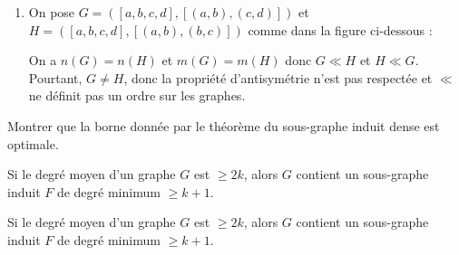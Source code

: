 \begin{td-sol}
\begin{enumerate}
\begin{enumerate}[label=(\alph*)]
            \item \textbf{Transitivité :} soient \(G, H\) et \(I\) trois graphes tels que \(G\) est sous-graphe de \(H\) et \(H\) est sous-graphe de \(I\).
            \begin{equation*}
                \begin{aligned}
                    V(G) \subseteq V(H) \quad\text{et}\quad V(H) \subseteq V(I) &\implies V(G) \subseteq V(I) \\
                    E(G) \subseteq E(H) \quad\text{et}\quad E(H) \subseteq E(I) &\implies E(G) \subseteq E(I)
                \end{aligned}
            \end{equation*}
            Ainsi, comme \(V(G) \subseteq V(I)\) et \(E(G) \subseteq E(I)\), on a bien \(G\) sous-graphe de \(I\).
        \end{enumerate}

        \item On pose \(G = ([a, b, c, d], [(a, b), (c, d)])\) et \(H = ([a, b, c, d], [(a, b), (b, c)])\) comme dans la figure ci-dessous :
        

        On a \(n(G) = n(H)\) et \(m(G) = m(H)\) donc \(G \ll H\) et \(H \ll G\).
        Pourtant, \(G \neq H\), donc la propriété d'antisymétrie n'est pas respectée et \(\ll\) ne définit pas un ordre sur les graphes.
    \end{enumerate}
\end{td-sol}

\begin{td-exo}
    Montrer que la borne donnée par le théorème du sous-graphe induit dense est optimale.

    \begin{theorem}
    Si le degré moyen d'un graphe \(G\) est \(\geq 2k\), alors \(G\) contient un sous-graphe induit \(F\) de degré minimum \(\geq k + 1\).
\end{theorem}

\end{td-exo}


\begin{theorem}
    Si le degré moyen d'un graphe \(G\) est \(\geq 2k\), alors \(G\) contient un sous-graphe induit \(F\) de degré minimum \(\geq k + 1\).
\end{theorem}

